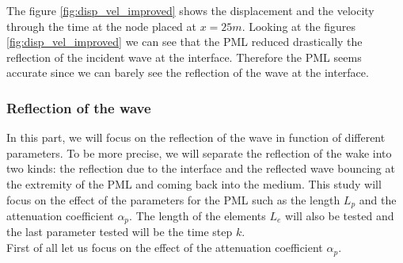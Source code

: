 The figure \ref{fig:disp_vel_improved} shows the displacement and the velocity through the time at the node placed at $x=25m$. 
Looking at the figures \ref{fig:disp_vel_improved} we can see that the PML reduced drastically the reflection of the incident wave at the interface. Therefore the PML seems accurate since we can barely see the reflection of the wave at the interface. \\

\subsubsection{Reflection of the wave}
In this part, we will focus on the reflection of the wave in function of different parameters. To be more precise, we will separate the reflection of the wake into two kinds: the reflection due to the interface and the reflected wave bouncing at the extremity of the PML and coming back into the medium. This study will focus on the effect of the parameters for the PML such as the length $L_p$ and the attenuation coefficient $\alpha_p$. The length of the elements $L_e$ will also be tested and the last parameter tested will be the time step $k$.\\ 
First of all let us focus on the effect of the attenuation coefficient $\alpha_p$.

